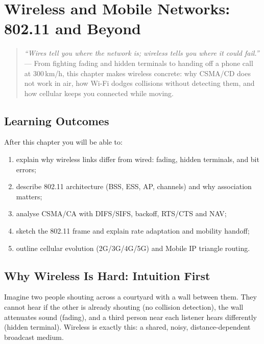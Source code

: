 \chapter{Wireless and Mobile Networks: 802.11 and Beyond}\label{ch:wireless}
\begin{quote}
\emph{``Wires tell you where the network is; wireless tells you where it could fail.''} --- From fighting fading and hidden terminals to handing off a phone call at 300\,km/h, this chapter makes wireless concrete: why CSMA/CD does not work in air, how Wi-Fi dodges collisions without detecting them, and how cellular keeps you connected while moving.
\end{quote}

\noindent{}%
\vspace{0.4em}

\section*{Learning Outcomes}
After this chapter you will be able to:
\begin{enumerate}[label=(L\arabic*)]
    \item explain why wireless links differ from wired: fading, hidden terminals, and bit errors;
    \item describe 802.11 architecture (BSS, ESS, AP, channels) and why association matters;
    \item analyse CSMA/CA with DIFS/SIFS, backoff, RTS/CTS and NAV;
    \item sketch the 802.11 frame and explain rate adaptation and mobility handoff;
    \item outline cellular evolution (2G/3G/4G/5G) and Mobile IP triangle routing.
\end{enumerate}

\section{Why Wireless Is Hard: Intuition First}\label{sec:wireless-hard}
Imagine two people shouting across a courtyard with a wall between them. They cannot hear if the other is already shouting (no collision detection), the wall attenuates sound (fading), and a third person near each listener hears differently (hidden terminal). Wireless is exactly this: a shared, noisy, distance-dependent broadcast medium.

